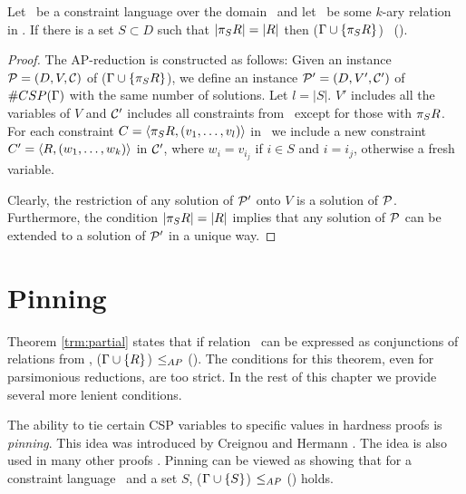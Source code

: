 \begin{lemma}\label{lem:projection}
Let \mrelset\ be a constraint language over the domain \mD\ and
 let \mR\ be some \(k\)-ary relation in \mrelset\@.
If there is a set \(S\subset D\) such that \(|\pi_{S}{R}|=|R|\) then 
\ccsp(\(\Gamma \cup \{{\pi_{S}{R}}\}\)) \maple\ \ccsp(\mrelset)\@.
\end{lemma}

\begin{proof}
The AP-reduction is constructed as follows: Given an instance \(\mathcal{P}=(D,V,\mathcal{C})\)
of \ccsp(\(\Gamma\cup \{\pi_{S}{R}\}\)), we define an 
instance \(\mathcal{P}'=(D,V',\mathcal{C}')\) of \(\#CSP(\Gamma)\) with the same number of solutions.
Let \(l=|S|\)\@. \(V'\) includes all the variables of \(V\) and
\(\mathcal{C}'\) includes all constraints from \mconset\ except for those with \(\pi_{S}{R}\). For each
constraint \(C=\langle \pi_{S}{R},(v_1,\dotsc,v_l) \rangle\) in \mconset\ 
we include a new constraint \(C'=\langle R,(w_1,\dotsc,w_k) \rangle\) in \(\mathcal{C}'\), where 
\(w_i=v_{i_j}\) if \(i\in S\) and \(i=i_j\), otherwise a fresh variable.

Clearly, the restriction of any solution of \(\mathcal{P}'\) onto \(V\) is a solution of \(\mathcal{P}\)\@.
Furthermore, the condition \(|\pi_{S}{R}|=|R|\) implies that any solution of \(\mathcal{P}\)
can be extended to a solution of \(\mathcal{P}'\) in a unique way.
\end{proof}


\section{Pinning}
Theorem \ref{trm:partial} states that if relation \mR\ can be expressed as conjunctions 
of relations from \mrelset, \ccsp(\(\Gamma \cup \{{R}\}\)) \(\le_{AP}\) \ccsp(\mrelset)\@.
The conditions for this theorem, even for parsimonious reductions, are too strict. 
In the rest of this chapter we provide several more lenient conditions.

The ability to tie certain CSP variables to specific values in hardness proofs is 
\emph{pinning}\@. This idea was introduced by Creignou and Hermann \cite{Nadia}. The idea
is also used in many other proofs \cite{bulatov07,Dyer,Trichotomy,madu}. Pinning can be
viewed as showing that for a constraint language \mrelset\ and a set \(S\), 
\ccsp(\(\Gamma \cup \{{S}\}\)) \(\le_{AP}\) \ccsp(\mrelset) holds.

